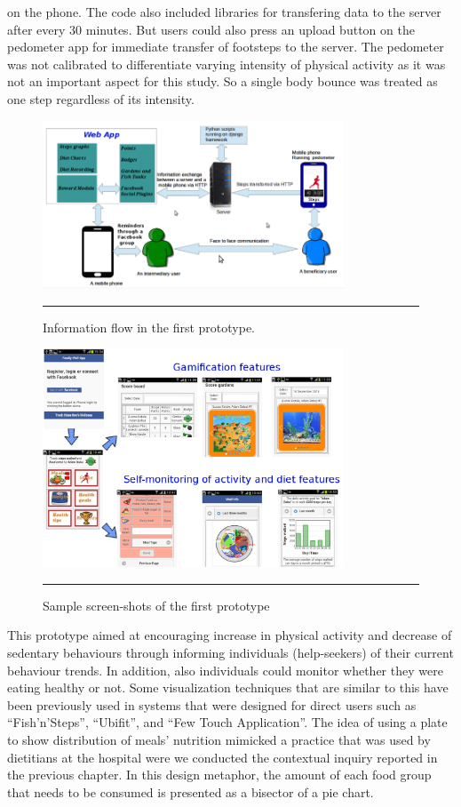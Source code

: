 on the phone. The code also included libraries for transfering data to the server after every 30 minutes. But users could also press an upload button on the pedometer app for immediate transfer of footsteps to the server. The pedometer was not calibrated to differentiate varying intensity of physical activity as it was not an important aspect for this study. So a single body bounce was treated as one step regardless of its intensity.

\begin{figure}[htbp]
  \centering
    \includegraphics[width=0.8\textwidth]{Figures/prototype_1.png}
    \rule{35em}{0.5pt}
  \caption{Information flow in the first prototype.}
  \label{figure:prototype_1}
\end{figure}

\begin{figure}[htbp]
  \centering
    \includegraphics[width=0.8\textwidth]{Figures/Version1/Prototype1Screenshots.png}
    \rule{35em}{0.5pt}
  \caption{Sample screen-shots of the first prototype}
  \label{figure:prototype_1_screens}
\end{figure}

This prototype aimed at encouraging increase in physical activity and  decrease of sedentary behaviours through informing individuals (help-seekers) of their current behaviour trends. In addition, also individuals could monitor whether they were eating healthy or not. Some visualization techniques that are similar to this have been previously used  in systems that were designed for direct users such as ``Fish'n'Steps''\citep{lin2006:fish}, ``Ubifit''\citep{klasnja2009:using},  and ``Few Touch Application''\citep{arsand:mobile}. The idea of using a plate to show distribution of meals' nutrition mimicked a practice that was used by dietitians at the hospital were we conducted the contextual inquiry reported in the previous chapter. In this design metaphor, the amount of each food group that needs to be consumed is presented as a bisector of a pie chart. 
